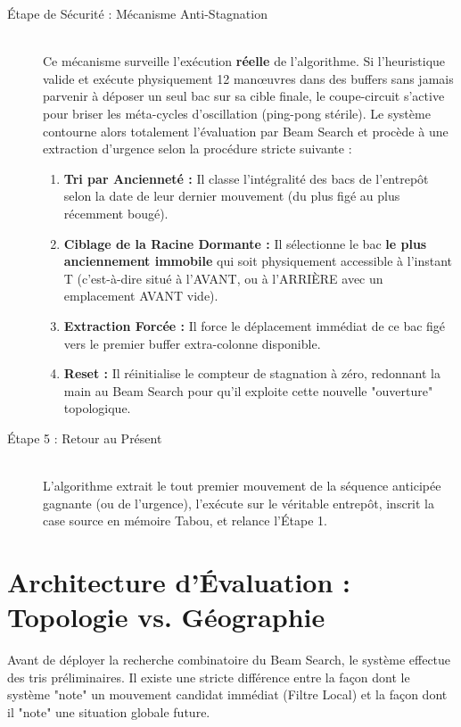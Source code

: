 \documentclass[11pt,a4paper]{article}
\begin{document}
\begin{description}
    \item[Étape de Sécurité : Mécanisme Anti-Stagnation] \hfill \\
    Ce mécanisme surveille l'exécution \textbf{réelle} de l'algorithme. Si l'heuristique valide et exécute physiquement 12 manœuvres dans des buffers sans jamais parvenir à déposer un seul bac sur sa cible finale, le coupe-circuit s'active pour briser les méta-cycles d'oscillation (ping-pong stérile). Le système contourne alors totalement l'évaluation par Beam Search et procède à une extraction d'urgence selon la procédure stricte suivante :
    \begin{enumerate}[noitemsep]
        \item \textbf{Tri par Ancienneté :} Il classe l'intégralité des bacs de l'entrepôt selon la date de leur dernier mouvement (du plus figé au plus récemment bougé).
        \item \textbf{Ciblage de la Racine Dormante :} Il sélectionne le bac \textbf{le plus anciennement immobile} qui soit physiquement accessible à l'instant T (c'est-à-dire situé à l'AVANT, ou à l'ARRIÈRE avec un emplacement AVANT vide).
        \item \textbf{Extraction Forcée :} Il force le déplacement immédiat de ce bac figé vers le premier buffer extra-colonne disponible.
        \item \textbf{Reset :} Il réinitialise le compteur de stagnation à zéro, redonnant la main au Beam Search pour qu'il exploite cette nouvelle "ouverture" topologique.
    \end{enumerate}
    
    \item[Étape 5 : Retour au Présent] \hfill \\
    L'algorithme extrait le tout premier mouvement de la séquence anticipée gagnante (ou de l'urgence), l'exécute sur le véritable entrepôt, inscrit la case source en mémoire Tabou, et relance l'Étape 1.
\end{description}

\section{Architecture d'Évaluation : Topologie vs. Géographie}

Avant de déployer la recherche combinatoire du Beam Search, le système effectue des tris préliminaires. Il existe une stricte différence entre la façon dont le système "note" un mouvement candidat immédiat (Filtre Local) et la façon dont il "note" une situation globale future.
\end{document}
